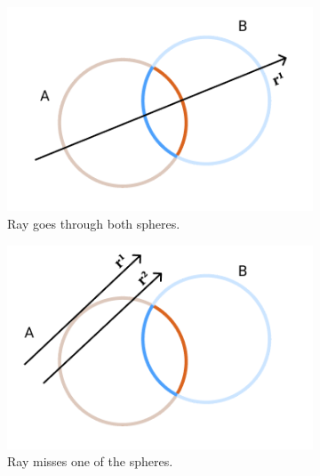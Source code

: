 \documentclass[a4paper,11pt,oneside]{article}
\begin{document}
\begin{figure}[ht]
     \centering
     \begin{subfigure}[b]{0.3\textwidth}
         \centering
         \includegraphics[width=\textwidth]{section3/3.4/intersection-case-1.png}
         \caption{Ray goes through both spheres.}
         \label{sec3.4:intersection-case-1}
     \end{subfigure}
     \hfill
     \begin{subfigure}[b]{0.3\textwidth}
         \centering
         \includegraphics[width=\textwidth]{section3/3.4/intersection-case-2.png}
         \caption{Ray misses one of the spheres.}
          \label{sec3.4:intersection-case-2}
     \end{subfigure}
     \hfill
     \begin{subfigure}[b]{0.3\textwidth}
         \centering

\end{subfigure}
\end{figure}
\end{document}
